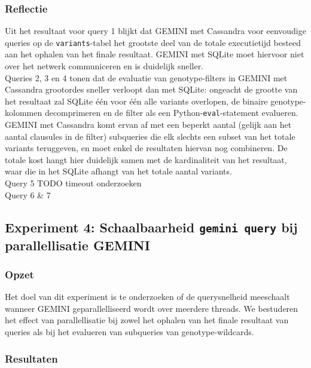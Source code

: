 \subsubsection{Reflectie}

Uit het resultaat voor query 1 blijkt dat GEMINI met Cassandra voor eenvoudige queries op de \texttt{variants}-tabel het grootste deel van de totale executietijd besteed aan het ophalen van het finale resultaat. GEMINI met SQLite moet hiervoor niet over het netwerk communiceren en is duidelijk sneller.\\
Queries 2, 3 en 4 tonen dat de evaluatie van genotype-filters in GEMINI met Cassandra grootordes sneller verloopt dan met SQLite: ongeacht de grootte van het resultaat zal SQLite \'e\'en voor \'e\'en alle variants overlopen, de binaire genotype-kolommen decomprimeren en de filter als een Python-\texttt{eval}-statement evalueren. GEMINI met Cassandra komt ervan af met een beperkt aantal (gelijk aan het aantal clausules in de filter) subqueries die elk slechts een subset van het totale variants teruggeven, en moet enkel de resultaten hiervan nog combineren. De totale kost hangt hier duidelijk samen met de kardinaliteit van het resultaat, waar die in het SQLite afhangt van het totale aantal variants.\\
Query 5 {\color{red} TODO timeout onderzoeken}\\
Query 6 \& 7

\subsection{Experiment 4: Schaalbaarheid \texttt{gemini query} bij parallellisatie GEMINI}
\label{exp4}

\subsubsection{Opzet}

Het doel van dit experiment is te onderzoeken of de querysnelheid meeschaalt wanneer GEMINI geparallelliseerd wordt over meerdere threads. We bestuderen het effect van parallellisatie bij zowel het ophalen van het finale resultaat van queries als bij het evalueren van subqueries van genotype-wildcards.

\subsubsection{Resultaten}

